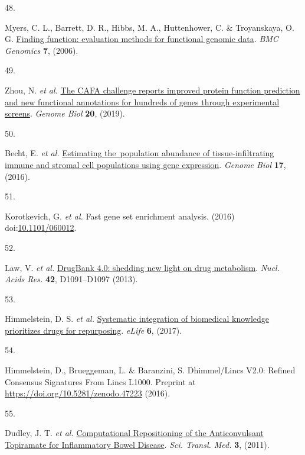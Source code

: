 \documentclass[
  a4paper,
]{article}
\newlength{\cslhangindent}
\newlength{\csllabelwidth}
\newlength{\cslentryspacingunit} %
\newenvironment{CSLReferences}[2] %
 {%
  \setlength{\parindent}{0pt}
  \ifodd #1
  \let\oldpar\par
  \def\par{\hangindent=\cslhangindent\oldpar}
  \fi
  \setlength{\parskip}{#2\cslentryspacingunit}
 }%
 {}
\newcommand{\CSLLeftMargin}[1]{\parbox[t]{\csllabelwidth}{#1}}
\newcommand{\CSLRightInline}[1]{\parbox[t]{\linewidth - \csllabelwidth}{#1}\break}
\begin{document}
\begin{CSLReferences}{0}{0}
\leavevmode{}%
\CSLLeftMargin{48. }%
\CSLRightInline{Myers, C. L., Barrett, D. R., Hibbs, M. A., Huttenhower, C. \& Troyanskaya, O. G. \href{https://doi.org/10.1186/1471-2164-7-187}{Finding function: evaluation methods for functional genomic data}. \emph{BMC Genomics} \textbf{7}, (2006).}

\leavevmode{}%
\CSLLeftMargin{49. }%
\CSLRightInline{Zhou, N. \emph{et al.} \href{https://doi.org/10.1186/s13059-019-1835-8}{The CAFA challenge reports improved protein function prediction and new functional annotations for hundreds of genes through experimental screens}. \emph{Genome Biol} \textbf{20}, (2019).}

\leavevmode{}%
\CSLLeftMargin{50. }%
\CSLRightInline{Becht, E. \emph{et al.} \href{https://doi.org/10.1186/s13059-016-1070-5}{Estimating the~population abundance of tissue-infiltrating immune and stromal cell populations using gene expression}. \emph{Genome Biol} \textbf{17}, (2016).}

\leavevmode{}%
\CSLLeftMargin{51. }%
\CSLRightInline{Korotkevich, G. \emph{et al.} Fast gene set enrichment analysis. (2016) doi:\href{https://doi.org/10.1101/060012}{10.1101/060012}.}

\leavevmode{}%
\CSLLeftMargin{52. }%
\CSLRightInline{Law, V. \emph{et al.} \href{https://doi.org/10.1093/nar/gkt1068}{DrugBank 4.0: shedding new light on drug metabolism}. \emph{Nucl. Acids Res.} \textbf{42}, D1091--D1097 (2013).}

\leavevmode{}%
\CSLLeftMargin{53. }%
\CSLRightInline{Himmelstein, D. S. \emph{et al.} \href{https://doi.org/10.7554/elife.26726}{Systematic integration of biomedical knowledge prioritizes drugs for repurposing}. \emph{eLife} \textbf{6}, (2017).}

\leavevmode{}%
\CSLLeftMargin{54. }%
\CSLRightInline{Himmelstein, D., Brueggeman, L. \& Baranzini, S. Dhimmel/Lincs V2.0: Refined Consensus Signatures From Lincs L1000. Preprint at \url{https://doi.org/10.5281/zenodo.47223} (2016).}

\leavevmode{}%
\CSLLeftMargin{55. }%
\CSLRightInline{Dudley, J. T. \emph{et al.} \href{https://doi.org/10.1126/scitranslmed.3002648}{Computational Repositioning of the Anticonvulsant Topiramate for Inflammatory Bowel Disease}. \emph{Sci. Transl. Med.} \textbf{3}, (2011).}


\end{CSLReferences}
\end{document}
